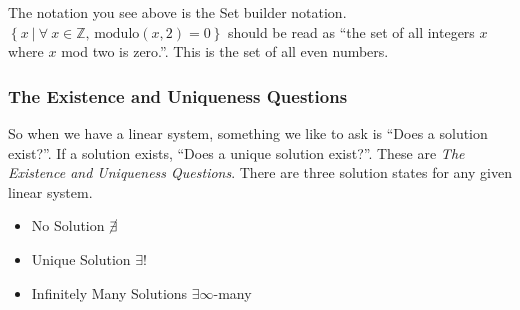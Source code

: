 \documentclass{article}
\begin{document}
The notation you see above is the Set builder notation.\\
$\left\{x\ |\ \forall\ x \in \mathbb{Z} \text{, modulo}(x, 2) = 0 \right\}$
should be read as ``the set of all integers $x$ where $x$ mod two is zero.''.
This is the set of all even numbers.

\pagebreak

\subsubsection{The Existence and Uniqueness Questions}
So when we have a linear system, something we like to ask is
``Does a solution exist?''. If a solution exists,
``Does a unique solution exist?''. These are \textit{The Existence and Uniqueness Questions}.
There are three solution states for any given linear system.

\begin{itemize}
   \item No Solution $\cancel{\exists}$
   \item Unique Solution $\exists!$
   \item Infinitely Many Solutions $\exists\infty$-many
\end{itemize}
\end{document}
